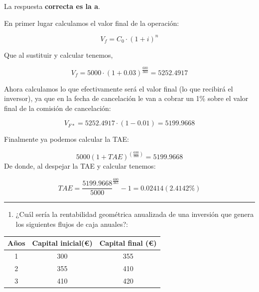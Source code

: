 \documentclass[
  letterpaper,
  DIV=11,
  numbers=noendperiod]{scrreprt}
\providecommand{\tightlist}{%
  \setlength{\itemsep}{0pt}\setlength{\parskip}{0pt}}\usepackage{longtable,booktabs,array}
\begin{document}
\begin{tcolorbox}[enhanced jigsaw, left=2mm, opacityback=0, colback=white, breakable, arc=.35mm, bottomrule=.15mm, rightrule=.15mm, toprule=.15mm, leftrule=.75mm, colframe=quarto-callout-tip-color-frame]
\begin{minipage}[t]{5.5mm}
\textcolor{quarto-callout-tip-color}{\faLightbulb}
\end{minipage}%
\begin{minipage}[t]{\textwidth - 5.5mm}

La respuesta \textbf{correcta es la a}.

En primer lugar calculamos el valor final de la operación:

\[V_f=C_0\cdot\left(1+i\right)^n\]

Que al sustituir y calcular tenemos,

\[V_f=5000\cdot(1+0.03)^{\frac{600}{360}}=5252.4917\]

Ahora calculamos lo que efectivamente será el valor final (lo que
recibirá el inversor), ya que en la fecha de cancelación le van a cobrar
un 1\% sobre el valor final de la comisión de cancelación:

\[V_{F*}=5252.4917\cdot\left(1-0.01\right)=5199.9668\]

Finalmente ya podemos calcular la TAE:

\[5000\left(1+TAE\right)^{\left(\frac{600}{360}\right)}=5199.9668\] De
donde, al despejar la TAE y calcular tenemos:

\[TAE=\frac{5199.9668 }{5000 }^ \frac{600}{365}-1=0.02414(2.4142\%)\]

\end{minipage}%
\end{tcolorbox}

\begin{center}\rule{0.5\linewidth}{0.5pt}\end{center}

\begin{enumerate}
\def\labelenumi{\arabic{enumi}.}
\setcounter{enumi}{87}
\tightlist
\item
  ¿Cuál sería la rentabilidad geométrica anualizada de una inversión que
  genera los siguientes flujos de caja anuales?:
\end{enumerate}

\begin{longtable}[]{@{}ccc@{}}
\toprule()
\textbf{Años} & \textbf{Capital inicial(€)} & \textbf{Capital final
(€)} \\
\midrule()
\endhead
1 & 300 & 355 \\
2 & 355 & 410 \\
3 & 410 & 420 \\
\bottomrule()
\end{longtable}
\end{document}
